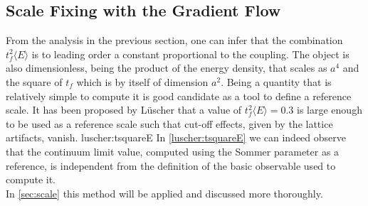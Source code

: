 \subsection{Scale Fixing with the Gradient Flow}
\label{sec:scale_fixing}
From the analysis in the previous section, one can infer that the combination $t_f^2\langle E\rangle$ is to leading order a constant proportional to the coupling. The object is also dimensionless, being the product of the energy density, that scales as $a^4$ and the square of $t_f$ which is by itself of dimension $a^2$. Being a quantity that is relatively simple to compute it is  good candidate as a tool to define a reference scale. 
It has been proposed by L{\"u}scher that a value of $t_f^2\langle E\rangle = 0.3$ is large enough to be used as a reference scale such that cut-off effects, given by the lattice artifacts, vanish. 
 {luscher:tsquareE}
In \cref{luscher:tsquareE} we can indeed observe that the continuum limit value, computed using the Sommer parameter as a reference, is independent from the definition of the basic observable used to compute it.\\
In \cref{sec:scale} this method will be applied and discussed more thoroughly.
 
